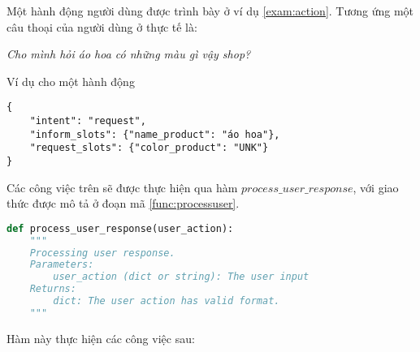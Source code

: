 Một hành động người dùng được trình bày ở ví dụ \ref{exam:action}.
Tương ứng một câu thoại của người dùng ở thực tế là:

\textit{Cho mình hỏi áo hoa có những màu gì vậy shop?}

\renewcommand{\textboxenvname}{Ví dụ}
\begin{textbox}{Ví dụ cho một hành động}
\begin{Verbatim}[breaklines=true, breakanywhere=true]
{
    "intent": "request",
    "inform_slots": {"name_product": "áo hoa"},
    "request_slots": {"color_product": "UNK"}
}
\end{Verbatim}
\end{textbox}

Các công việc trên sẽ được thực hiện qua hàm
$process\_user\_response$, với giao thức được
mô tả ở đoạn mã \ref{func:processuser}.

\renewcommand{\lstlistingname}{Hàm}
\begin{lstlisting}[caption={Hàm xử lý phản hồi người dùng},label={func:processuser},language=python]
def process_user_response(user_action):
    """
    Processing user response.
    Parameters:
        user_action (dict or string): The user input
    Returns:
        dict: The user action has valid format.
    """
\end{lstlisting}

Hàm này thực hiện các công việc sau:

